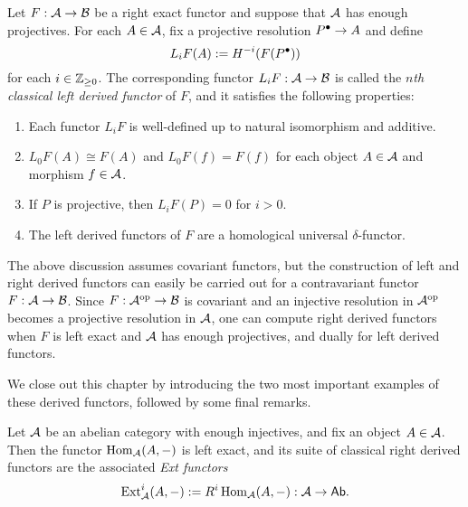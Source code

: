 \begin{proposition}
  \label{prop_classical_right_derfunc}
  Let $F: \abcat{A} \to \abcat{B}$ be a right exact functor and
  suppose that $\abcat{A}$ has enough projectives.
  For each $A \in \abcat{A}$, fix a projective resolution
  $\cochaincomp{P} \to A$ and define
  \[
    L_i F(A) := H^{-i}(F(\cochaincomp{P}))
  \]
  for each $i \in \zpos$.
  The corresponding functor $L_iF: \abcat{A} \to \abcat{B}$ is called
  the \emph{$n$th classical left derived functor} of $F$, and it
  satisfies the following properties:
  \begin{enumerate}
    \item
      Each functor $L_iF$ is well-defined up to natural isomorphism
      and additive.

    \item
      $L_0F(A) \cong F(A)$ and $L_0F(f) = F(f)$ for each object $A
      \in \abcat{A}$ and morphism $f \in \abcat{A}$.

    \item
      If $P$ is projective, then $L_iF(P) = 0$ for $i > 0$.

    \item
      The left derived functors of $F$ are a homological universal
      $\delta$-functor.
  \end{enumerate}
\end{proposition}

\begin{remark}
  The above discussion assumes covariant functors, but the
  construction of left and right derived functors can easily be
  carried out for a contravariant functor $F: \abcat{A} \to \abcat{B}$.
  Since $F: \op{\abcat{A}} \to \abcat{B}$ is covariant and an
  injective resolution in $\op{\abcat{A}}$ becomes a projective
  resolution in $\abcat{A}$, one can compute right derived functors
  when $F$ is left exact and $\abcat{A}$ has enough projectives, and
  dually for left derived functors.
\end{remark}

We close out this chapter by introducing the two most important
examples of these derived functors, followed by some final remarks.

\begin{definition}
  Let $\abcat{A}$ be an abelian category with enough injectives, and
  fix an object $A \in \abcat{A}$.
  Then the functor $\Hom_{\abcat{A}}(A, -)$ is left exact, and its
  suite of classical right derived functors are the associated
  \emph{Ext functors}
  \[
    \Ext{i}{\abcat{A}}(A, -) := R^i\Hom_{\abcat{A}}(A, -): \abcat{A} \to \Ab.
  \]
  \vspace{-24pt}
\end{definition}

